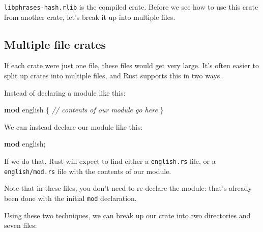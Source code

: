 \documentclass[a4paper,]{book}
\newenvironment{Shaded}{\begin{snugshade}}{\end{snugshade}}
\newcommand{\KeywordTok}[1]{\textcolor[rgb]{0.13,0.29,0.53}{\textbf{{#1}}}}
\newcommand{\CommentTok}[1]{\textcolor[rgb]{0.56,0.35,0.01}{\textit{{#1}}}}
\newcommand{\NormalTok}[1]{{#1}}
\begin{document}
\texttt{libphrases-hash.rlib} is the compiled crate. Before we see how
to use this crate from another crate, let's break it up into multiple
files.

\subsection{Multiple file crates}\label{multiple-file-crates}

If each crate were just one file, these files would get very large. It's
often easier to split up crates into multiple files, and Rust supports
this in two ways.

Instead of declaring a module like this:

\begin{Shaded}
\begin{Highlighting}[]
\KeywordTok{mod} \NormalTok{english \{}
    \CommentTok{// contents of our module go here}
\NormalTok{\}}
\end{Highlighting}
\end{Shaded}

We can instead declare our module like this:

\begin{Shaded}
\begin{Highlighting}[]
\KeywordTok{mod} \NormalTok{english;}
\end{Highlighting}
\end{Shaded}

If we do that, Rust will expect to find either a \texttt{english.rs}
file, or a \texttt{english/mod.rs} file with the contents of our module.

Note that in these files, you don't need to re-declare the module:
that's already been done with the initial \texttt{mod} declaration.

Using these two techniques, we can break up our crate into two
directories and seven files:

\begin{Shaded}
\end{Shaded}
\end{document}
